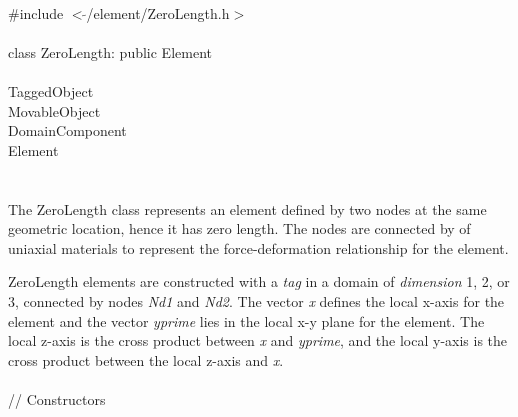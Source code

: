 
   \\
\indent \#include $<\tilde{ }$/element/ZeroLength.h$>$  \\

  \\
\indent class ZeroLength: public Element \\

 \\
\indent TaggedObject \\
\indent MovableObject \\
\indent\indent DomainComponent \\
\indent\indent\indent Element \\
\indent\indent\indent{} \\

  \\
\indent 
The ZeroLength class represents an element defined by two nodes at the same geometric
location, hence it has zero length.
The nodes are connected by 
of uniaxial materials to represent the force-deformation relationship for the element. 

ZeroLength elements are constructed with a {\em tag} in a domain of {\em dimension} 1, 2, or 3,
connected by nodes {\em Nd1} and {\em Nd2}. 
The vector {\em x} defines the local x-axis for the element and the vector {\em yprime}
lies in the local x-y plane for the element.  The local z-axis is the cross product between 
{\em x} and {\em yprime}, and the local y-axis is the cross product between the local z-axis
and {\em x}.
\\

 \\
\indent // Constructors \\
 \\

 \\

